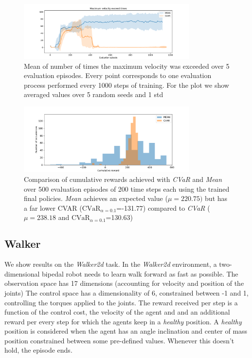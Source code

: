 \begin{figure}[ht]
    \centering
    \includegraphics[width=0.8\textwidth]{images/Cheetah_offpolicy_medium/times_exceedvel_withstds.pdf}
    \caption{Mean of number of times the maximum velocity was exceeded over 5 evaluation episodes.
    Every point corresponds to one evaluation process performed every 1000 steps of training.
    For the plot we show averaged values over 5 random seeds and 1 std}
    \label{fig:vel_exceed_cheetah}

\end{figure}

\begin{figure}[ht]
    \centering
    \includegraphics[width=0.8\textwidth]{images/Cheetah_offpolicy_medium/hist_evaluation_numevalsteps200_500eps.pdf}
    \caption{Comparison of cumulative rewards achieved with \textit{CVaR} and \textit{Mean}
    over 500 evaluation episodes of 200 time steps each using the trained final policies.
    \textit{Mean} achieves an expected value  ($\mu=220.75)$  but 
    has a far lower CVAR ($\text{CVaR}_{\alpha= 0.1}$=-131.77) compared to
    \textit{CVaR} ($\mu=238.18$ and $\text{CVaR}_{\alpha= 0.1}$=130.63)}
    \label{fig:hist_cum_rewards200steps_cheetah}
\end{figure}

\clearpage

\subsection{Walker}

We show results on the \textit{Walker2d} task.
In the \textit{Walker2d} environment, a two-dimensional bipedal robot needs to learn walk forward
as fast as possible.
The observation space has 17 dimensions (accounting for velocity and position of the joints)
The control space has a dimensionality of 6, constrained between -1 and 1, 
controlling the torques applied to the joints.
The reward received per step is a function of the control cost, the velocity of the agent and 
and an additional reward per every step for which the agents keep in a \textit{healthy} position.
A \textit{healthy} position is considered when the agent has an angle inclination and center of mass
position constrained between some pre-defined values. Whenever this doesn't hold, the episode ends.

